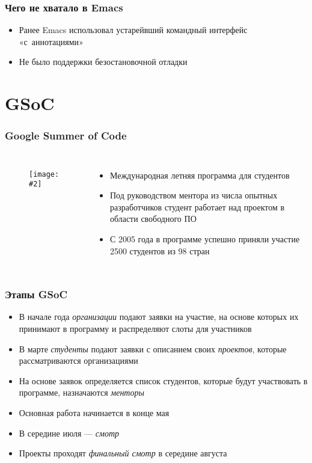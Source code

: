 \documentclass[onlymath]{beamer}
\newcommand\neword\emph
\newcommand{\cenfig}[2]{\begin{figure}\centering\texttt{[image: \#2]}
  \end{figure}}
\begin{document}
\begin{frame}
  \frametitle{Чего не хватало в Emacs}
  \begin{itemize}
  \item Ранее Emacs использовал устарейвший командный интерфейс
    «с аннотациями»
  \item Не было поддержки безостановочной отладки
  \end{itemize}  
\end{frame}

\section{GSoC}
\begin{frame}
  \frametitle{Google Summer of Code}
  \begin{columns}
    \cenfig{0.1}{google.jpg}
  \begin{itemize}
  \item Международная летняя программа для студентов
  \item Под руководством ментора из числа опытных разработчиков
    студент работает над проектом в области свободного \textsc{ПО}
  \item С 2005 года в программе успешно приняли участие 2500 студентов
    из 98 стран
  \end{itemize}
\end{columns}
\end{frame}

\begin{frame}
  \frametitle{Этапы GSoC}
  \begin{itemize}
  \item В начале года \neword{организации} подают заявки на участие,
    на основе которых их принимают в программу и распределяют слоты
    для участников
  \item В марте \neword{студенты} подают заявки с описанием своих
    \neword{проектов}, которые рассматриваются организациями
  \item На основе заявок определяется список студентов, которые будут
    участвовать в программе, назначаются \neword{менторы}
  \item Основная работа начинается в конце мая
  \item В середине июля — \neword{смотр}
  \item Проекты проходят \neword{финальный смотр} в середине августа
  \end{itemize}
\end{frame}
\end{document}
